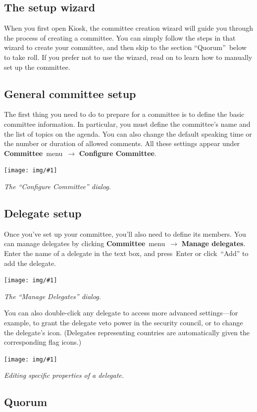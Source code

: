 \documentclass{article}
\newcommand{\navstep}[2]{\navitem{#1}~{#2}~$\rightarrow$}
\newcommand{\navitem}[1]{\textbf{#1}}
\newcommand{\encouragebreak}[1]{\vfil\penalty-#1\vfilneg}
\newcommand{\img}[2]{%
  \begin{center}
    \vspace{6pt}
    \encouragebreak{100}
    \centerline{\texttt{[image: img/\#1]}}
    {\slshape #2}
    \encouragebreak{300}
  \end{center}
}
\begin{document}
\subsection{The setup wizard}

When you first open Kiosk, the committee creation wizard will guide you through the process of creating a committee.
You can simply follow the steps in that wizard to create your committee, and then skip to the section ``Quorum''~below to take roll.
If you prefer not to use the wizard, read on to learn how to manually set up the committee.

\subsection{General committee setup}

The first thing you need to do to prepare for a committee is to define the basic committee information.
In particular, you must define the committee's name and the list of topics on the agenda.
You can also change the default speaking time or the number or duration of allowed comments.
All these settings appear under \navstep{Committee}{menu} \navitem{Configure Committee}.

\img{configure_committee}{The ``Configure Committee'' dialog.}

\subsection{Delegate setup}

Once you've set up your committee, you'll also need to define its members.
You can manage delegates by clicking \navstep{Committee}{menu} \navitem{Manage delegates}.
Enter the name of a delegate in the text box, and press~Enter or click~``Add'' to add the delegate.

\img{manage_delegates}{The ``Manage Delegates'' dialog.}

You can also double-click any delegate to access more advanced settings---for example, to grant the delegate veto power in the security council, or to change the delegate's icon.
(Delegates representing countries are automatically given the corresponding flag icons.)

\img{manage_delegates_grant_veto}{Editing specific properties of a delegate.}

\subsection{Quorum}
\end{document}

